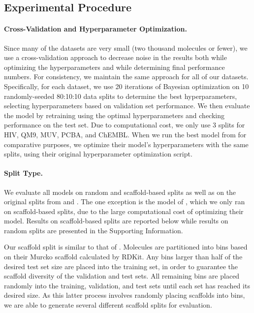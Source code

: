 \documentclass[journal=jcisd8,manuscript=article]{achemso}
\begin{document}
\subsection{Experimental Procedure}

\paragraph{Cross-Validation and Hyperparameter Optimization.}

Since many of the datasets are very small (two thousand molecules or fewer), we use a cross-validation approach to decrease noise in the results both while optimizing the hyperparameters and while determining final performance numbers. For consistency, we maintain the same approach for all of our datasets. Specifically, for each dataset, we use 20 iterations of Bayesian optimization on 10 randomly-seeded 80:10:10 data splits to determine the best hyperparameters, selecting hyperparameters based on validation set performance. We then evaluate the model by retraining using the optimal hyperparameters and checking performance on the test set. Due to computational cost, we only use 3 splits for HIV, QM9, MUV, PCBA, and ChEMBL. When we run the best model from \citeauthor{mayr2018chembl}\cite{mayr2018chembl} for comparative purposes, we optimize their model's hyperparameters with the same splits, using their original hyperparameter optimization script.







\paragraph{Split Type.} We evaluate all models on random and scaffold-based splits as well as on the original splits from \citeauthor{Wu_2018}\cite{Wu_2018} and \citeauthor{mayr2018chembl}\cite{mayr2018chembl}. The one exception is the model of \citeauthor{mayr2018chembl}\cite{mayr2018chembl}, which we only ran on scaffold-based splits, due to the large computational cost of optimizing their model. Results on scaffold-based splits are reported below while results on random splits are presented in the Supporting Information.

Our scaffold split is similar to that of \citeauthor{Wu_2018}\cite{Wu_2018}. Molecules are partitioned into bins based on their Murcko scaffold calculated by RDKit\cite{landrum2006rdkit}. Any bins larger than half of the desired test set size are placed into the training set, in order to guarantee the scaffold diversity of the validation and test sets. All remaining bins are placed randomly into the training, validation, and test sets until each set has reached its desired size. As this latter process involves randomly placing scaffolds into bins, we are able to generate several different scaffold splits for evaluation. 
\end{document}
